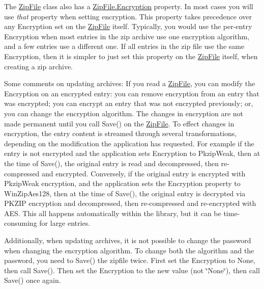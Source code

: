 The \mbox{\hyperlink{class_super_tiled2_unity_1_1_ionic_1_1_zip_1_1_zip_file}{Zip\+File}} class also has a \mbox{\hyperlink{class_super_tiled2_unity_1_1_ionic_1_1_zip_1_1_zip_file_aeaa88018eaea63cd09f9e05a853c51f8}{Zip\+File.\+Encryption}} property. In most cases you will use {\itshape that} property when setting encryption. This property takes precedence over any {\ttfamily Encryption} set on the {\ttfamily \mbox{\hyperlink{class_super_tiled2_unity_1_1_ionic_1_1_zip_1_1_zip_file}{Zip\+File}}} itself. Typically, you would use the per-\/entry Encryption when most entries in the zip archive use one encryption algorithm, and a few entries use a different one. If all entries in the zip file use the same Encryption, then it is simpler to just set this property on the \mbox{\hyperlink{class_super_tiled2_unity_1_1_ionic_1_1_zip_1_1_zip_file}{Zip\+File}} itself, when creating a zip archive. 

Some comments on updating archives\+: If you read a {\ttfamily \mbox{\hyperlink{class_super_tiled2_unity_1_1_ionic_1_1_zip_1_1_zip_file}{Zip\+File}}}, you can modify the Encryption on an encrypted entry\+: you can remove encryption from an entry that was encrypted; you can encrypt an entry that was not encrypted previously; or, you can change the encryption algorithm. The changes in encryption are not made permanent until you call Save() on the {\ttfamily \mbox{\hyperlink{class_super_tiled2_unity_1_1_ionic_1_1_zip_1_1_zip_file}{Zip\+File}}}. To effect changes in encryption, the entry content is streamed through several transformations, depending on the modification the application has requested. For example if the entry is not encrypted and the application sets {\ttfamily Encryption} to {\ttfamily Pkzip\+Weak}, then at the time of {\ttfamily Save()}, the original entry is read and decompressed, then re-\/compressed and encrypted. Conversely, if the original entry is encrypted with {\ttfamily Pkzip\+Weak} encryption, and the application sets the {\ttfamily Encryption} property to {\ttfamily Win\+Zip\+Aes128}, then at the time of {\ttfamily Save()}, the original entry is decrypted via P\+K\+Z\+IP encryption and decompressed, then re-\/compressed and re-\/encrypted with A\+ES. This all happens automatically within the library, but it can be time-\/consuming for large entries. 

Additionally, when updating archives, it is not possible to change the password when changing the encryption algorithm. To change both the algorithm and the password, you need to Save() the zipfile twice. First set the {\ttfamily Encryption} to None, then call {\ttfamily Save()}. Then set the {\ttfamily Encryption} to the new value (not \char`\"{}\+None\char`\"{}), then call {\ttfamily Save()} once again. 

